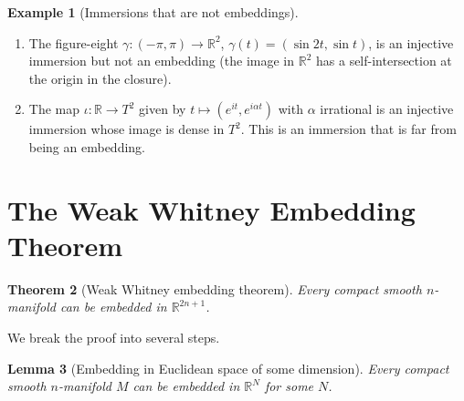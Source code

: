 \documentclass[12pt,a4paper,openany]{book}
\newtheorem{theorem}{Theorem}[section]
\newtheorem{lemma}[theorem]{Lemma}
\theoremstyle{definition}
\newtheorem{example}[theorem]{Example}
\theoremstyle{remark}
\newcommand{\R}{\mathbb{R}}
\begin{document}
\begin{example}[Immersions that are not embeddings]\label{ex:immersion-not-embedding}
\begin{enumerate}[label=(\alph*)]
  \item The figure-eight $\gamma\colon (-\pi,\pi)\to\R^2$,
    $\gamma(t) = (\sin 2t, \sin t)$, is an injective immersion but
    not an embedding (the image in $\R^2$ has a self-intersection
    at the origin in the closure).
  \item The map $\iota\colon \R\to T^2$ given by $t\mapsto(e^{it},e^{i\alpha t})$
    with $\alpha$ irrational is an injective immersion whose image is
    dense in $T^2$. This is an immersion that is far from being an embedding.
\end{enumerate}
\end{example}

\section{The Weak Whitney Embedding Theorem}\label{sec:weak-whitney}

\begin{theorem}[Weak Whitney embedding theorem]\label{thm:weak-whitney}
Every compact smooth $n$-manifold can be embedded in $\R^{2n+1}$.
\end{theorem}

We break the proof into several steps.

\begin{lemma}[Embedding in Euclidean space of some dimension]\label{lem:embed-some-RN}
Every compact smooth $n$-manifold $M$ can be embedded in $\R^N$
for some $N$.
\end{lemma}
\end{document}
